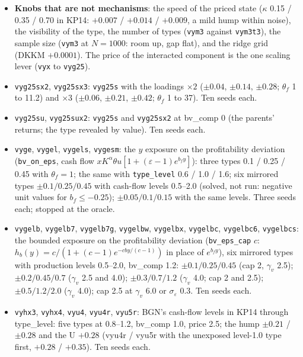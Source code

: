 \begin{itemize}
\item \textbf{Knobs that are not mechanisms}: the speed of the priced state ($\kappa$ 0.15 / 0.35 / 0.70 in KP14: $+0.007$ / $+0.014$ / $+0.009$, a mild hump within noise), the visibility of the type, the number of types (\texttt{vym3} against \texttt{vym3t3}), the sample size (\texttt{vym3} at $N=1000$: room up, gap flat), and the ridge grid (DKKM $+0.0001$). The price of the interacted component is the one scaling lever (\texttt{vyx} to \texttt{vyg25}).
\item \texttt{vyg25sx2}, \texttt{vyg25sx3}: \texttt{vyg25s} with the loadings $\times2$ ($\pm0.04$, $\pm0.14$, $\pm0.28$; $\theta_f$ 1 to 11.2) and $\times3$ ($\pm0.06$, $\pm0.21$, $\pm0.42$; $\theta_f$ 1 to 37). Ten seeds each.
\item \texttt{vyg25su}, \texttt{vyg25sux2}: \texttt{vyg25s} and \texttt{vyg25sx2} at bv\_comp 0 (the parents' returns; the type revealed by value). Ten seeds each.
\item \texttt{vyge}, \texttt{vygel}, \texttt{vygels}, \texttt{vygesm}: the $y$ exposure on the profitability deviation (\texttt{bv\_on\_eps}, cash flow $x K^\alpha \theta u [1 + (\varepsilon-1) e^{b_f y}]$): three types 0.1 / 0.25 / 0.45 with $\theta_f=1$; the same with \texttt{type\_level} 0.6 / 1.0 / 1.6; six mirrored types $\pm0.1/0.25/0.45$ with cash-flow levels 0.5--2.0 (solved, not run: negative unit values for $b_f\le-0.25$); $\pm0.05/0.1/0.15$ with the same levels. Three seeds each; stopped at the oracle.
\item \texttt{vygelb}, \texttt{vygelb7}, \texttt{vygelb7g}, \texttt{vygelbw}, \texttt{vygelbx}, \texttt{vygelbc}, \texttt{vygelbc6}, \texttt{vygelbcs}: the bounded exposure on the profitability deviation (\texttt{bv\_eps\_cap} $c$: $h_b(y) = c/(1+(c-1)e^{-cby/(c-1)})$ in place of $e^{b_f y}$), six mirrored types with production levels 0.5--2.0, bv\_comp 1.2: $\pm0.1/0.25/0.45$ (cap 2, $\gamma_v$ 2.5); $\pm0.2/0.45/0.7$ ($\gamma_v$ 2.5 and 4.0); $\pm0.3/0.7/1.2$ ($\gamma_v$ 4.0; cap 2 and 2.5); $\pm0.5/1.2/2.0$ ($\gamma_v$ 4.0); cap 2.5 at $\gamma_v$ 6.0 or $\sigma_\varepsilon$ 0.3. Ten seeds each.
\item \texttt{vyhx3}, \texttt{vyhx4}, \texttt{vyu4}, \texttt{vyu4r}, \texttt{vyu5r}: BGN's cash-flow levels in KP14 through type\_level: five types at 0.8--1.2, bv\_comp 1.0, price 2.5; the hump $\pm0.21$ / $\pm0.28$ and the U $+0.28$ (vyu4r / vyu5r with the unexposed level-1.0 type first, $+0.28$ / $+0.35$). Ten seeds each.

\end{itemize}
